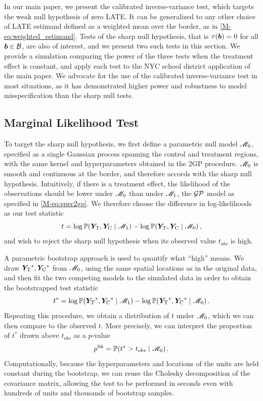 \documentclass[letter,12pt]{article}
\begin{document}
In our main paper, we present the calibrated inverse-variance test, which targets the weak null hypothesis of zero LATE.
It can be generalized to any other choice of LATE estimand defined as a weighted mean over the border, as in \autoref{M-eq:weighted_estimand}.
Tests of the sharp null hypothesis, that is $\tau(\bm{b})=0$ for all $\bm{b} \in \mathcal{B}$, are also of interest, and we present two such tests in this section.
We provide a simulation comparing the power of the three tests when the treatment effect is constant, and apply each test to the NYC school district application of the main paper.
We advocate for the use of the calibrated inverse-variance test in most situations, as it has demonstrated higher power and robustness to model misspecification than the sharp null tests.

\subsection{Marginal Likelihood Test}

To target the sharp null hypothesis, we first define a parametric null model \(\mathscr{M}_0\),
specified as a single Gaussian process spanning the control and treatment regions,
with the same kernel and hyperparameters obtained in the 2GP procedure.
\(\mathscr{M}_0\) is smooth and continuous at the border,
and therefore accords with the sharp null hypothesis.
Intuitively, if there is a treatment effect,
the likelihood of the observations should be lower under \(\mathscr{M}_0\) than under \(\mathscr{M}_1\),
the \(\operatorname{\mathcal{GP}}\) model as specified in \autoref*{M-eq:spec2gp}.
We therefore choose the difference in log-likelihoods as our test statistic
\begin{equation}
    t = \log \Pr\del{\yt{}, \yc{} \mid \modalt} - \log \Pr\del{\yt{}, \yc{} \mid \modnull} \,,
\end{equation}
and wish to reject the sharp null hypothesis when its observed value \(t_{obs}\) is high.

A parametric bootstrap approach is used to quantify what ``high'' means. We draw \(\bm{Y}_{\mathrm{T}}{}^*,\bm{Y}_{\mathrm{C}}{}^*\) from \(\mathscr{M}_0\),
using the same spatial locations as in the original data,
and then fit the two competing models to the simulated data in order to obtain the bootstrapped test statistic
\begin{equation}
    t^* = \log \Pr\del{\yt{}^*, \yc{}^* \mid \modalt} - \log \Pr\del{\yt{}^*, \yc{}^* \mid \modnull}\,.
\end{equation}
Repeating this procedure, we obtain a distribution of \(t\) under \(\mathscr{M}_0\),
which we can then compare to the observed \(t\).
More precisely, we can interpret the proportion of \(t^*\) drawn above \(t_{obs}\) as a \(p\)-value
\begin{equation}
    p^{\mathrm{lik}} = \Pr\del{t^* > t_{obs} \mid \modnull}\,.
\end{equation}
Computationally, because the hyperparameters and locations of the units are held constant during the bootstrap, we can reuse the Cholesky decomposition of the covariance matrix, allowing the test to be performed in seconds even with hundreds of units and thousands of bootstrap samples.
\end{document}
